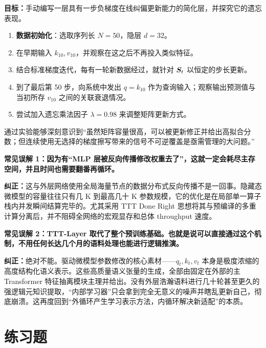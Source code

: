 \begin{labbox}[title=Lab 8: TTT-Linear 一级矩阵手动更新与序列遗忘追踪]
\textbf{目标：}手动编写一层具有一步负梯度在线纠偏更新能力的简化层，并探究它的遗忘表现。

\begin{enumerate}
    \item \textbf{数据初始化}：选取序列长 $N=50$，隐层 $d=32$。
    \item 在早期输入 $k_{10}, v_{10}$，并观察在这之后不再投入类似特征。
    \item 结合标准梯度迭代，每有一轮新数据经过，就针对 $\boldsymbol{S}_t$ 以恒定的步长更新。
    \item 到了最后第 50 步，向系统中发出 $q = k_{10}$ 作为查询输入；观察输出预测值与当初所存 $v_{10}$ 之间的关联衰退情况。
    \item 尝试加入遗忘乘法因子 $\lambda=0.98$ 来调整矩阵更新方式。
\end{enumerate}

通过实验能够深刻意识到“虽然矩阵容量很高，可以被更新修正并给出高拟合分数；但连续使用无选择的梯度擦写带来的信号不可逆覆盖是亟需管理的大问题。”
\end{labbox}

\begin{misconceptionbox}
\textbf{常见误解 1：因为有“MLP 层被反向传播修改权重去了”，这就一定会耗尽主存空间，并且时间也需要翻番再循环。}

\textbf{纠正：}这与外层网络使用全局海量节点的数据分布式反向传播不是一回事。隐藏态微模型的容量往往只有几 K 到最高几十 K 参数规模，它的优化是在局部单一算子栈内并发瞬间结算完毕的。尤其采用 TTT Done Right 思想将其与预编译的多重计算分离后，并不阻碍全网络的宏观显存和总体 throughput 速度。
\end{misconceptionbox}

\begin{misconceptionbox}
\textbf{常见误解 2：TTT-Layer 取代了整个预训练基础。也就是说可以直接通过这个机制，不用任何长达几个月的语料处理也能进行逻辑推演。}

\textbf{纠正：}绝对不能。驱动微模型参数修改的核心素材——$q_t, k_t, v_t$ 本身是极度浓缩的高度结构化语义表示。这些高质量语义张量的生成，全部由固定在外部的主 Transformer 特征抽离模块主理并给出。没有外层浩瀚语料进行几十轮甚至更久的强逻辑元知识提取，“内部学习器”只会拿到完全无意义的噪声并瞎乱更新自己，彻底崩溃。这再度回到“外循环产生学习表示方法，内循环解决新适配”的本质。
\end{misconceptionbox}

\section{练习题}
\label{sec:ttt_layers_exercises}

